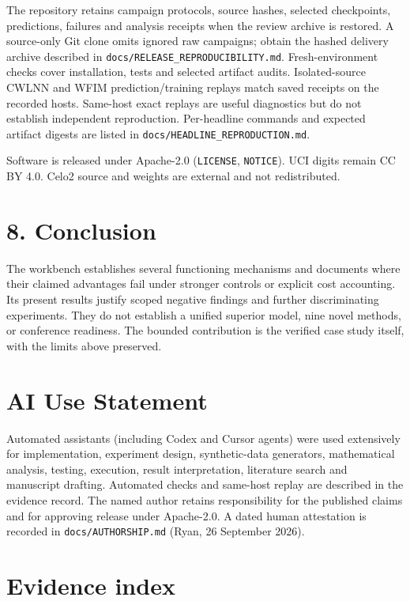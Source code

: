 \documentclass[
  11pt,
  a4paper,
]{article}
\begin{document}
The repository retains campaign protocols, source hashes, selected
checkpoints, predictions, failures and analysis receipts when the review
archive is restored. A source-only Git clone omits ignored raw
campaigns; obtain the hashed delivery archive described in
\texttt{docs/RELEASE\_REPRODUCIBILITY.md}. Fresh-environment checks
cover installation, tests and selected artifact audits. Isolated-source
CWLNN and WFIM prediction/training replays match saved receipts on the
recorded hosts. Same-host exact replays are useful diagnostics but do
not establish independent reproduction. Per-headline commands and
expected artifact digests are listed in
\texttt{docs/HEADLINE\_REPRODUCTION.md}.

Software is released under Apache-2.0 (\texttt{LICENSE},
\texttt{NOTICE}). UCI digits remain CC BY 4.0. Celo2 source and weights
are external and not redistributed.

\section{8. Conclusion}\label{conclusion}

The workbench establishes several functioning mechanisms and documents
where their claimed advantages fail under stronger controls or explicit
cost accounting. Its present results justify scoped negative findings
and further discriminating experiments. They do not establish a unified
superior model, nine novel methods, or conference readiness. The bounded
contribution is the verified case study itself, with the limits above
preserved.

\section{AI Use Statement}\label{ai-use-statement}

Automated assistants (including Codex and Cursor agents) were used
extensively for implementation, experiment design, synthetic-data
generators, mathematical analysis, testing, execution, result
interpretation, literature search and manuscript drafting. Automated
checks and same-host replay are described in the evidence record. The
named author retains responsibility for the published claims and for
approving release under Apache-2.0. A dated human attestation is
recorded in \texttt{docs/AUTHORSHIP.md} (Ryan, 26 September 2026).

\section{Evidence index}\label{evidence-index}
\end{document}
